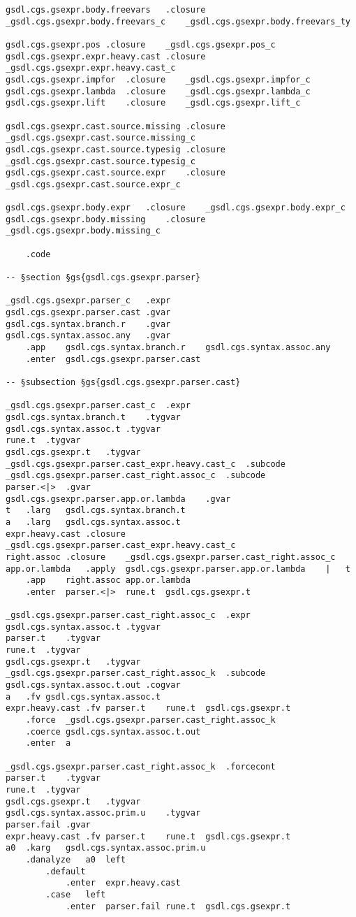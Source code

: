 \documentclass{report}
\begin{document}
\begin{verbatim}
gsdl.cgs.gsexpr.body.freevars	.closure	_gsdl.cgs.gsexpr.body.freevars_c	_gsdl.cgs.gsexpr.body.freevars_ty

gsdl.cgs.gsexpr.pos	.closure	_gsdl.cgs.gsexpr.pos_c
gsdl.cgs.gsexpr.expr.heavy.cast	.closure	_gsdl.cgs.gsexpr.expr.heavy.cast_c
gsdl.cgs.gsexpr.impfor	.closure	_gsdl.cgs.gsexpr.impfor_c
gsdl.cgs.gsexpr.lambda	.closure	_gsdl.cgs.gsexpr.lambda_c
gsdl.cgs.gsexpr.lift	.closure	_gsdl.cgs.gsexpr.lift_c

gsdl.cgs.gsexpr.cast.source.missing	.closure	_gsdl.cgs.gsexpr.cast.source.missing_c
gsdl.cgs.gsexpr.cast.source.typesig	.closure	_gsdl.cgs.gsexpr.cast.source.typesig_c
gsdl.cgs.gsexpr.cast.source.expr	.closure	_gsdl.cgs.gsexpr.cast.source.expr_c

gsdl.cgs.gsexpr.body.expr	.closure	_gsdl.cgs.gsexpr.body.expr_c
gsdl.cgs.gsexpr.body.missing	.closure	_gsdl.cgs.gsexpr.body.missing_c

	.code

-- §section §gs{gsdl.cgs.gsexpr.parser}

_gsdl.cgs.gsexpr.parser_c	.expr
gsdl.cgs.gsexpr.parser.cast	.gvar
gsdl.cgs.syntax.branch.r	.gvar
gsdl.cgs.syntax.assoc.any	.gvar
	.app	gsdl.cgs.syntax.branch.r	gsdl.cgs.syntax.assoc.any
	.enter	gsdl.cgs.gsexpr.parser.cast

-- §subsection §gs{gsdl.cgs.gsexpr.parser.cast}

_gsdl.cgs.gsexpr.parser.cast_c	.expr
gsdl.cgs.syntax.branch.t	.tygvar
gsdl.cgs.syntax.assoc.t	.tygvar
rune.t	.tygvar
gsdl.cgs.gsexpr.t	.tygvar
_gsdl.cgs.gsexpr.parser.cast_expr.heavy.cast_c	.subcode
_gsdl.cgs.gsexpr.parser.cast_right.assoc_c	.subcode
parser.<|>	.gvar
gsdl.cgs.gsexpr.parser.app.or.lambda	.gvar
t	.larg	gsdl.cgs.syntax.branch.t
a	.larg	gsdl.cgs.syntax.assoc.t
expr.heavy.cast	.closure	_gsdl.cgs.gsexpr.parser.cast_expr.heavy.cast_c
right.assoc	.closure	_gsdl.cgs.gsexpr.parser.cast_right.assoc_c
app.or.lambda	.apply	gsdl.cgs.gsexpr.parser.app.or.lambda	|	t
	.app	right.assoc	app.or.lambda
	.enter	parser.<|>	rune.t	gsdl.cgs.gsexpr.t

_gsdl.cgs.gsexpr.parser.cast_right.assoc_c	.expr
gsdl.cgs.syntax.assoc.t	.tygvar
parser.t	.tygvar
rune.t	.tygvar
gsdl.cgs.gsexpr.t	.tygvar
_gsdl.cgs.gsexpr.parser.cast_right.assoc_k	.subcode
gsdl.cgs.syntax.assoc.t.out	.cogvar
a	.fv	gsdl.cgs.syntax.assoc.t
expr.heavy.cast	.fv	parser.t	rune.t	gsdl.cgs.gsexpr.t
	.force	_gsdl.cgs.gsexpr.parser.cast_right.assoc_k
	.coerce	gsdl.cgs.syntax.assoc.t.out
	.enter	a

_gsdl.cgs.gsexpr.parser.cast_right.assoc_k	.forcecont
parser.t	.tygvar
rune.t	.tygvar
gsdl.cgs.gsexpr.t	.tygvar
gsdl.cgs.syntax.assoc.prim.u	.tygvar
parser.fail	.gvar
expr.heavy.cast	.fv	parser.t	rune.t	gsdl.cgs.gsexpr.t
a0	.karg	gsdl.cgs.syntax.assoc.prim.u
	.danalyze	a0	left
		.default
			.enter	expr.heavy.cast
		.case	left
			.enter	parser.fail	rune.t	gsdl.cgs.gsexpr.t


\end{verbatim}
\end{document}
